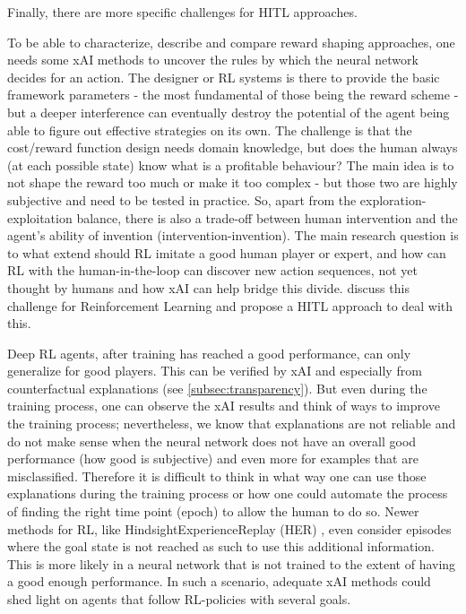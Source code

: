 \documentclass[twoside,11pt]{article}
\begin{document}
Finally, there are more specific challenges for HITL approaches. 

To be able to characterize, describe and compare reward shaping approaches, one needs some xAI methods to uncover the rules by which the neural network decides for an action. The designer or RL systems is there to provide the basic framework parameters - the most fundamental of those being the reward scheme - but a deeper interference can eventually destroy the potential of the agent being able to figure out effective strategies on its own. The challenge is that the cost/reward function design needs domain knowledge, but does the human always (at each possible state) know what is a profitable behaviour? The main idea is to not shape the reward too much or make it too complex - but those two are highly subjective and need to be tested in practice. So, apart from the exploration-exploitation balance, there is also a trade-off between human intervention and the agent's ability of invention (intervention-invention). The main research question is to what extend should RL imitate a good human player or expert, and how can RL with the human-in-the-loop can discover new action sequences, not yet thought by humans and how xAI can help bridge this divide. \cite{LeeSmithAbbeel:2021:FeedbackPreferenceHITLLearningPEBBLE} discuss this challenge for Reinforcement Learning and propose a HITL approach to deal with this.

Deep RL agents, after training has reached a good performance, can only generalize for good players. This can be verified by xAI and especially from counterfactual explanations (see \ref{subsec:transparency}). But even during the training process, one can observe the xAI results and think of ways to improve the training process; nevertheless, we know that explanations are not reliable and do not make sense when the neural network does not have an overall good performance (how good is subjective) and even more for examples that are misclassified. Therefore it is difficult to think in what way one can use those explanations during the training process or how one could automate the process of finding the right time point (epoch) to allow the human to do so. Newer methods for RL, like HindsightExperienceReplay (HER) \cite{Andrychowicz:2017:HERHindsightExperienceReplay}, even consider episodes where the goal state is not reached as such to use this additional information. This is more likely in a neural network that is not trained to the extent of having a good enough performance. In such a scenario, adequate xAI methods could shed light on agents that follow RL-policies with several goals. 
\end{document}
